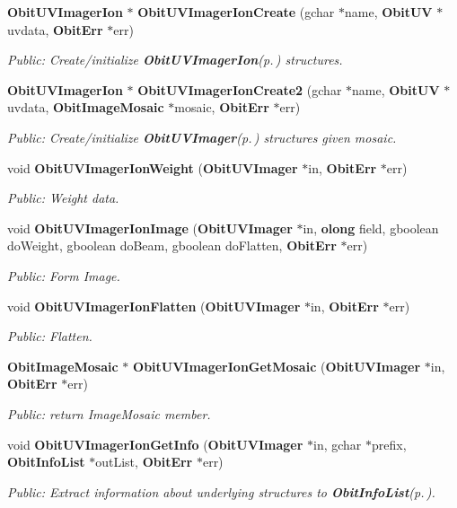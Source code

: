 \begin{CompactItemize}
{\bf Obit\-UVImager\-Ion} $\ast$ {\bf Obit\-UVImager\-Ion\-Create} (gchar $\ast$name, {\bf Obit\-UV} $\ast$uvdata, {\bf Obit\-Err} $\ast$err)
\begin{CompactList}\small\item\em Public: Create/initialize {\bf Obit\-UVImager\-Ion}{\rm (p.\,\pageref{structObitUVImagerIon})} structures. \item\end{CompactList}\item 
{\bf Obit\-UVImager\-Ion} $\ast$ {\bf Obit\-UVImager\-Ion\-Create2} (gchar $\ast$name, {\bf Obit\-UV} $\ast$uvdata, {\bf Obit\-Image\-Mosaic} $\ast$mosaic, {\bf Obit\-Err} $\ast$err)
\begin{CompactList}\small\item\em Public: Create/initialize {\bf Obit\-UVImager}{\rm (p.\,\pageref{structObitUVImager})} structures given mosaic. \item\end{CompactList}\item 
void {\bf Obit\-UVImager\-Ion\-Weight} ({\bf Obit\-UVImager} $\ast$in, {\bf Obit\-Err} $\ast$err)
\begin{CompactList}\small\item\em Public: Weight data. \item\end{CompactList}\item 
void {\bf Obit\-UVImager\-Ion\-Image} ({\bf Obit\-UVImager} $\ast$in, {\bf olong} field, gboolean do\-Weight, gboolean do\-Beam, gboolean do\-Flatten, {\bf Obit\-Err} $\ast$err)
\begin{CompactList}\small\item\em Public: Form Image. \item\end{CompactList}\item 
void {\bf Obit\-UVImager\-Ion\-Flatten} ({\bf Obit\-UVImager} $\ast$in, {\bf Obit\-Err} $\ast$err)
\begin{CompactList}\small\item\em Public: Flatten. \item\end{CompactList}\item 
{\bf Obit\-Image\-Mosaic} $\ast$ {\bf Obit\-UVImager\-Ion\-Get\-Mosaic} ({\bf Obit\-UVImager} $\ast$in, {\bf Obit\-Err} $\ast$err)
\begin{CompactList}\small\item\em Public: return Image\-Mosaic member. \item\end{CompactList}\item 
void {\bf Obit\-UVImager\-Ion\-Get\-Info} ({\bf Obit\-UVImager} $\ast$in, gchar $\ast$prefix, {\bf Obit\-Info\-List} $\ast$out\-List, {\bf Obit\-Err} $\ast$err)
\begin{CompactList}\small\item\em Public: Extract information about underlying structures to {\bf Obit\-Info\-List}{\rm (p.\,\pageref{structObitInfoList})}. \item\end{CompactList}\end{CompactItemize}


